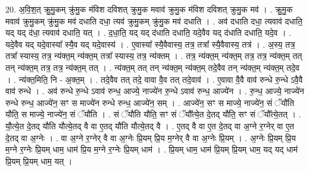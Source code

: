 \documentclass[17pt]{extarticle}
\begin{document}
20. अ॒वि॒श॒त् क्रु॒मु॒कम् क्रु॑मु॒क म॑विश दविशत् क्रुमु॒क मवाव॑ क्रुमु॒क म॑विश दविशत् क्रुमु॒क मव॑ । . क्रु॒मु॒क मवाव॑ क्रुमु॒कम् क्रु॑मु॒क मव॑ दधाति दधा॒ त्यव॑ क्रुमु॒कम् क्रु॑मु॒क मव॑ दधाति । . अव॑ दधाति दधा॒ त्यवाव॑ दधाति॒ यद् यद् द॑धा॒ त्यवाव॑ दधाति॒ यत् । . द॒धा॒ति॒ यद् यद् द॑धाति दधाति॒ यदे॒वैव यद् द॑धाति दधाति॒ यदे॒व । . यदे॒वैव यद् यदे॒वास्या᳚ स्यै॒व यद् यदे॒वास्य॑ । . ए॒वास्या᳚ स्यै॒वैवास्य॒ तत्र॒ तत्रा᳚ स्यै॒वैवास्य॒ तत्र॑ । . अ॒स्य॒ तत्र॒ तत्रा᳚ स्यास्य॒ तत्र॒ न्य॑क्त॒म् न्य॑क्त॒म् तत्रा᳚ स्यास्य॒ तत्र॒ न्य॑क्तम् । . तत्र॒ न्य॑क्त॒म् न्य॑क्त॒म् तत्र॒ तत्र॒ न्य॑क्त॒म् तत् तन् न्य॑क्त॒म् तत्र॒ तत्र॒ न्य॑क्त॒म् तत् । . न्य॑क्त॒म् तत् तन् न्य॑क्त॒म् न्य॑क्त॒म् तदे॒वैव तन् न्य॑क्त॒म् न्य॑क्त॒म् तदे॒व । . न्य॑क्त॒मिति॒ नि - अ॒क्त॒म् । . तदे॒वैव तत् तदे॒ वावा वै॒व तत् तदे॒वाव॑ । . ए॒वावा वै॒वै वाव॑ रुन्धे रु॒न्धे ऽवै॒वै वाव॑ रुन्धे । . अव॑ रुन्धे रु॒न्धे ऽवाव॑ रुन्ध॒ आज्ये॒ नाज्ये॑न रु॒न्धे ऽवाव॑ रुन्ध॒ आज्ये॑न । . रु॒न्ध॒ आज्ये॒ नाज्ये॑न रुन्धे रुन्ध॒ आज्ये॑न॒ सꣳ स माज्ये॑न रुन्धे रुन्ध॒ आज्ये॑न॒ सम् । . आज्ये॑न॒ सꣳ स माज्ये॒ नाज्ये॑न॒ सं ॅयौ॑ति यौति॒ स माज्ये॒ नाज्ये॑न॒ सं ॅयौ॑ति । . सं ॅयौ॑ति यौति॒ सꣳ सं ॅयौ᳚त्ये॒त दे॒तद् यौ॑ति॒ सꣳ सं ॅयौ᳚त्ये॒तत् । . यौ॒त्ये॒त दे॒तद् यौ॑ति यौत्ये॒तद् वै वा ए॒तद् यौ॑ति यौत्ये॒तद् वै । . ए॒तद् वै वा ए॒त दे॒तद् वा अ॒ग्ने र॒ग्नेर् वा ए॒त दे॒तद् वा अ॒ग्नेः । . वा अ॒ग्ने र॒ग्नेर् वै वा अ॒ग्नेः प्रि॒यम् प्रि॒य म॒ग्नेर् वै वा अ॒ग्नेः प्रि॒यम् । . अ॒ग्नेः प्रि॒यम् प्रि॒य म॒ग्ने र॒ग्नेः प्रि॒यम् धाम॒ धाम॑ प्रि॒य म॒ग्ने र॒ग्नेः प्रि॒यम् धाम॑ । . प्रि॒यम् धाम॒ धाम॑ प्रि॒यम् प्रि॒यम् धाम॒ यद् यद् धाम॑ प्रि॒यम् प्रि॒यम् धाम॒ यत् । \newline
\end{document}
